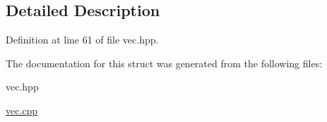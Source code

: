 \subsection{Detailed Description}


Definition at line 61 of file vec.\-hpp.



The documentation for this struct was generated from the following files\-:\begin{DoxyCompactItemize}
\item 
vec.\-hpp\item 
\hyperlink{vec_8cpp}{vec.\-cpp}\end{DoxyCompactItemize}
